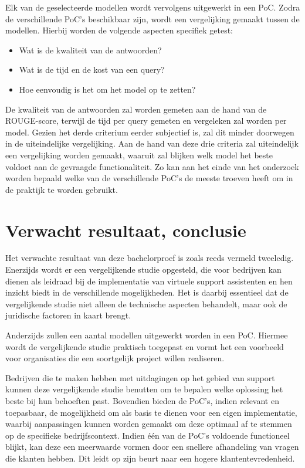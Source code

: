 Elk van de geselecteerde modellen wordt vervolgens uitgewerkt in een PoC. Zodra de verschillende PoC’s beschikbaar zijn, wordt een vergelijking gemaakt tussen de modellen. Hierbij worden de volgende aspecten specifiek getest:

\begin{itemize} 
    \item Wat is de kwaliteit van de antwoorden? 
    \item Wat is de tijd en de kost van een query?
    \item Hoe eenvoudig is het om het model op te zetten? 
\end{itemize}

De kwaliteit van de antwoorden zal worden gemeten aan de hand van de ROUGE-score, terwijl de tijd per query gemeten en vergeleken zal worden per model. Gezien het derde criterium eerder subjectief is, zal dit minder doorwegen in de uiteindelijke vergelijking. Aan de hand van deze drie criteria zal uiteindelijk een vergelijking worden gemaakt, waaruit zal blijken welk model het beste voldoet aan de gevraagde functionaliteit. Zo kan aan het einde van het onderzoek worden bepaald welke van de verschillende PoC's de meeste troeven heeft om in de praktijk te worden gebruikt.


\section{Verwacht resultaat, conclusie}%
\label{sec:verwachte_resultaten}

Het verwachte resultaat van deze bachelorproef is zoals reeds vermeld tweeledig. Enerzijds wordt er een vergelijkende studie opgesteld, die voor bedrijven kan dienen als leidraad bij de implementatie van virtuele support assistenten en hen inzicht biedt in de verschillende mogelijkheden. Het is daarbij essentieel dat de vergelijkende studie niet alleen de technische aspecten behandelt, maar ook de juridische factoren in kaart brengt.

Anderzijds zullen een aantal modellen uitgewerkt worden in een PoC. Hiermee wordt de vergelijkende studie praktisch toegepast en vormt het een voorbeeld voor organisaties die een soortgelijk project willen realiseren.

Bedrijven die te maken hebben met uitdagingen op het gebied van support kunnen deze vergelijkende studie benutten om te bepalen welke oplossing het beste bij hun behoeften past. Bovendien bieden de PoC's, indien relevant en toepasbaar, de mogelijkheid om als basis te dienen voor een eigen implementatie, waarbij aanpassingen kunnen worden gemaakt om deze optimaal af te stemmen op de specifieke bedrijfscontext. Indien één van de PoC's voldoende functioneel blijkt, kan deze een meerwaarde vormen door een snellere afhandeling van vragen die klanten hebben. Dit leidt op zijn beurt naar een hogere klantentevredenheid. 

